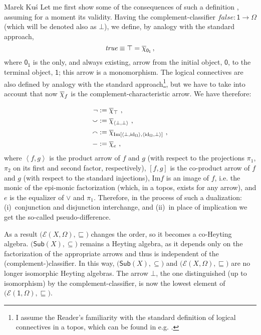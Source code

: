 \begin{artengenv}{Marek Ku\'s}
Let me first show some of the consequences of such a definition  \parencite[cf. e.g.][]{mortensen-1995, estrada-gonzalez-2010}, assuming for a moment its validity. Having the complement-classifier $ \textit{false}:\textsf{1}\to\Omega $ (which will be denoted also as $ \bot $), we define, by analogy with the standard approach,
\begin{equation}\label{true}
\textit{true}\equiv\top=\ochi_{\textsf{0}_{\textsf{1}}}\,,
\end{equation}
where $ \textsf{0}_{\textsf{1}} $ is the only, and always existing, arrow from the initial object, $ \textsf{0} $, to the terminal object, $ \textsf{1} $; this arrow is a monomorphism.
The logical connectives are also defined by analogy with the standard approach\footnote{I assume the Reader's familiarity with the standard definition of logical connectives in a topos, which can be found in e.g. \parencite[p.139]{goldblatt-2006}.}, but we have to take into account that now $ \overline{\chi}_f $ is the complement-characteristic arrow. We have therefore:

\begin{align*}
\lnot &:= \overline{\chi}_{\top} \ ,\\
\smallsmile &:= \overline{\chi}_{\left<\bot, \bot\right>} \ ,\\
\smallfrown &:= \overline{\chi}_{\text{Im}\left[\left<\bot,\text{id}_\Omega\right>,\left<\text{id}_\Omega,\bot\right>\right]} \ ,\\
-&:=\overline{\chi}_e \ ,
\notag
\end{align*}
where $ \left<f, g\right> $ is the product arrow of $ f $ and $ g $ (with respect to the projections $ \pi_1 $, $ \pi_2 $ on its first and second factor, respectively), $ \left[f,g\right] $ is the co-product arrow of $ f $ and $ g $ (with respect to the standard injections), $ \text{Im} f $ is an image of $ f $, i.e. the monic of the epi-monic factorization (which, in a topos, exists for any arrow), and $e$ is the equalizer of $ \lor $ and $ \pi_1 $. Therefore, in the process of such a dualization: (i)~conjunction and disjunction interchange, and (ii)~in place of implication we get the so-called pseudo-difference.

As a result $ \big(\mathcal{E}(X,\Omega), \sqsubseteq\!\big) $ changes the order, so it becomes a co-Heyting algebra. $ \big(\textsf{Sub}(X), \subseteq\!\big) $ remains a Heyting algebra, as it depends only on the factorization of the appropriate arrows and thus is independent of the (complement-)classifier. In this way, $ \big(\textsf{Sub}(X), \subseteq\!\big) $  and $ \big(\mathcal{E}(X,\Omega), \sqsubseteq\!\big) $ are no longer isomorphic Heyting algebras. The arrow $ \bot $, the one distinguished (up to isomorphism) by the complement-classifier, is now the lowest element of $ \big(\mathcal{E}(\textsf{1},\Omega), \sqsubseteq\!\big) $. 


\end{artengenv}
